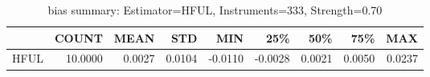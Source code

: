 \begin{table}[ht]
\centering
\caption{bias summary: Estimator=HFUL, Instruments=333, Strength=0.70}
\begin{tabular}{lrrrrrrrr}
\toprule
 & COUNT & MEAN & STD & MIN & 25\% & 50\% & 75\% & MAX \\
\midrule
HFUL & 10.0000 & 0.0027 & 0.0104 & -0.0110 & -0.0028 & 0.0021 & 0.0050 & 0.0237 \\
\bottomrule
\end{tabular}
\end{table}
